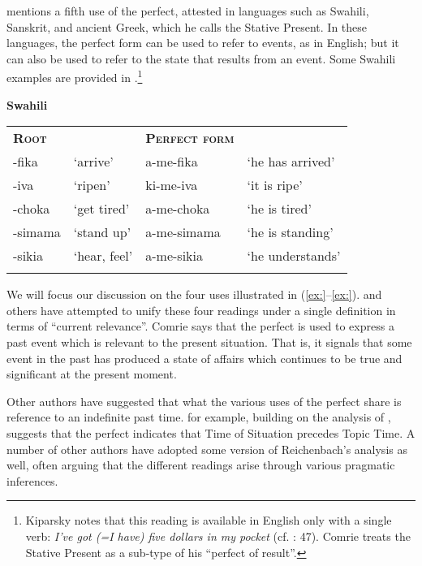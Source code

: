 \citet{Kiparsky2002} mentions a fifth use of the perfect, attested in languages such as Swahili, Sanskrit, and ancient Greek, which he calls the Stative Present. In these languages, the perfect form can be used to refer to events, as in English; but it can also be used to refer to the state that results from an event. Some Swahili examples are provided in .\footnote{Kiparsky notes that this reading is available in English only with a single verb: \textit{I’ve got (=I have) five dollars in my pocket} (cf. \citealt{Jespersen1931}: 47). Comrie treats the Stative Present as a sub-type of his “perfect of result”.}


\ea
\textbf{Swahili} \citet{Ashton1944}
\z

\begin{tabularx}{\textwidth}{XXXX}
\lsptoprule
\bfseries\scshape Root &  & \bfseries\scshape Perfect form & \\
-fika & ‘arrive’ & a-me-fika & ‘he has arrived’\\
-iva & ‘ripen’ & ki-me-iva & ‘it is ripe’\\
-choka & ‘get tired’ & a-me-choka & ‘he is tired’\\
-simama & ‘stand up’ & a-me-simama & ‘he is standing’\\
-sikia & ‘hear, feel’ & a-me-sikia & ‘he understands’\\
\lspbottomrule
\end{tabularx}

We will focus our discussion on the four uses illustrated in (\ref{ex:}--\ref{ex:}). \citet{Comrie1976} and others have attempted to unify these four readings under a single definition in terms of “current relevance”. Comrie says that the perfect is used to express a past event which is relevant to the present situation. That is, it signals that some event in the past has produced a state of affairs which continues to be true and significant at the present moment.



Other authors have suggested that what the various uses of the perfect share is reference to an indefinite past time. \citet{Klein1992,Klein1994} for example, building on the analysis of \citet{Reichenbach1947}, suggests that the perfect indicates that Time of Situation precedes Topic Time. A number of other authors have adopted some version of Reichenbach’s analysis as well, often arguing that the different readings arise through various pragmatic inferences.



